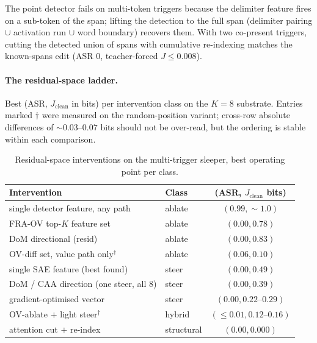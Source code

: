 \documentclass{article}
\theoremstyle{plain}
\theoremstyle{definition}
\theoremstyle{remark}
\begin{document}
The point detector fails on multi-token triggers because the delimiter feature fires on a sub-token of the span; lifting the detection to the full span (delimiter pairing $\cup$ activation run $\cup$ word boundary) recovers them. With two co-present triggers, cutting the detected union of spans with cumulative re-indexing matches the known-spans edit (ASR $0$, teacher-forced $J \le 0.008$).

\paragraph{The residual-space ladder.} Best (ASR, $J_{\text{clean}}$ in bits) per intervention class on the $K{=}8$ substrate. Entries marked $\dagger$ were measured on the random-position variant; cross-row absolute differences of ${\sim}0.03$--$0.07$ bits should not be over-read, but the ordering is stable within each comparison.

\begin{table}[h]
\caption{Residual-space interventions on the multi-trigger sleeper, best operating point per class.}
\label{tab:ladder}
\centering
\small
\begin{tabular}{llc}
\toprule
Intervention & Class & (ASR, $J_{\text{clean}}$ bits) \\
\midrule
single detector feature, any path & ablate & $(0.99, {\sim}1.0)$ \\
FRA-OV top-$K$ feature set & ablate & $(0.00, 0.78)$ \\
DoM directional (resid) & ablate & $(0.00, 0.83)$ \\
OV-diff set, value path only$^\dagger$ & ablate & $(0.06, 0.10)$ \\
single SAE feature (best found) & steer & $(0.00, 0.49)$ \\
DoM / CAA direction (one steer, all 8) & steer & $(0.00, 0.39)$ \\
gradient-optimised vector & steer & $(0.00, 0.22\text{--}0.29)$ \\
OV-ablate $+$ light steer$^\dagger$ & hybrid & $(\le 0.01, 0.12\text{--}0.16)$ \\
attention cut $+$ re-index & structural & $(0.00, 0.000)$ \\
\bottomrule
\end{tabular}
\end{table}
\end{document}
